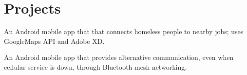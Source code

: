 \documentclass[]{wow}
\begin{document}
\begin{minipage}[t]{0.65\textwidth}


\section{Projects}

\descript{}
\begin{tightemize}
\small{}
\item An Android mobile app that that connects homeless people to nearby jobs; uses GoogleMaps API and Adobe XD.
\end{tightemize}
\sectionsep 

\descript{}
\begin{tightemize}
\small{}
\item An Android mobile app that provides alternative communication, even when cellular service is down, through Bluetooth mesh networking.
\end{tightemize}
\sectionsep 


\end{minipage}
\end{document}
